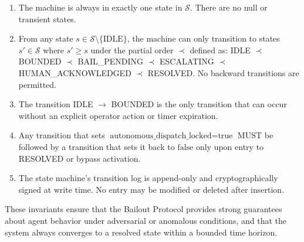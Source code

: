 \begin{enumerate}
  \item[\textbf{I1}] The machine is always in exactly one state in $\mathcal{S}$. There are no null or transient states.
  \item[\textbf{I2}] From any state $s \in \mathcal{S} \setminus \{\text{IDLE}\}$, the machine can only transition to states $s' \in \mathcal{S}$ where $s' \geq s$ under the partial order $\prec$ defined as: IDLE $\prec$ BOUNDED $\prec$ BAIL\_PENDING $\prec$ ESCALATING $\prec$ HUMAN\_ACKNOWLEDGED $\prec$ RESOLVED. No backward transitions are permitted.
  \item[\textbf{I3}] The transition IDLE $\rightarrow$ BOUNDED is the only transition that can occur without an explicit operator action or timer expiration.
  \item[\textbf{I4}] Any transition that sets $\text{autonomous\_dispatch\_locked} = \text{true}$ MUST be followed by a transition that sets it back to $\text{false}$ only upon entry to RESOLVED or bypass activation.
  \item[\textbf{I5}] The state machine's transition log is append-only and cryptographically signed at write time. No entry may be modified or deleted after insertion.
\end{enumerate}

\bigskip

These invariants ensure that the Bailout Protocol provides strong guarantees about agent behavior under adversarial or anomalous conditions, and that the system always converges to a resolved state within a bounded time horizon.